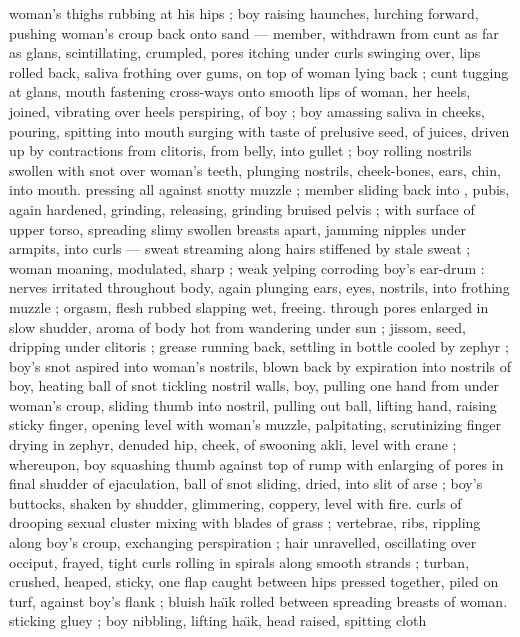 woman's thighs rubbing at his hips ; boy raising haunches, lurching 
forward, pushing woman's croup back onto sand --- member, 
withdrawn from cunt as far as glans, scintillating, crumpled, pores 
itching under curls {\dashcom} swinging over, lips rolled back, saliva frothing 
over gums, on top of woman lying back ; cunt tugging at glans, 
mouth fastening cross-ways onto smooth lips of woman, her heels, 
joined, vibrating over heels perspiring, of boy ; boy amassing saliva 
in cheeks, pouring, spitting into mouth surging with taste of 
prelusive seed, of juices, driven up by contractions from clitoris, from 
belly, into gullet ; boy rolling nostrils swollen with snot over woman's 
teeth, plunging nostrils, cheek-bones, ears, chin, into mouth. 
pressing all against snotty muzzle ; member sliding back into 
, pubis, again hardened, grinding, releasing, grinding 
bruised pelvis ; with surface of upper torso, spreading slimy swollen 
breasts apart, jamming nipples under armpits, into curls --- sweat 
streaming along hairs stiffened by stale sweat ; woman moaning, 
modulated, sharp ; weak yelping corroding boy's ear-drum : nerves 
irritated throughout body, again plunging ears, eyes, nostrils, into 
frothing muzzle ; orgasm, flesh rubbed slapping wet, freeing. 
through pores enlarged in slow shudder, aroma of body hot from 
wandering under sun ; jissom, seed, dripping under clitoris ; grease 
running back, settling in bottle cooled by zephyr ; boy's snot aspired 
into woman's nostrils, blown back by expiration into nostrils of boy,
heating {\col} ball of snot tickling nostril walls, boy, pulling one hand from 
under woman's croup, sliding thumb into nostril, pulling out ball,
lifting hand, raising sticky finger, opening level with woman's muzzle,
palpitating, scrutinizing {\col} finger drying in zephyr, denuded hip, 
cheek, of swooning akli, level with crane ; whereupon, boy squashing 
thumb against top of rump {\col} with enlarging of pores in final shudder 
of ejaculation, ball of snot sliding, dried, into slit of arse ; boy's 
buttocks, shaken by shudder, glimmering, coppery, level with fire. 
curls of drooping sexual cluster mixing with blades of grass ;
vertebrae, ribs, rippling along boy's croup, exchanging perspiration 
; hair unravelled, oscillating over occiput, frayed, tight curls rolling in 
spirals along smooth strands ; turban, crushed, heaped, sticky, one 
flap caught between hips pressed together, piled on turf, against 
boy's flank ; bluish ha\"{\i}k rolled between spreading breasts of woman. 
sticking gluey ; boy nibbling, lifting ha\"{\i}k, head raised, spitting cloth 
